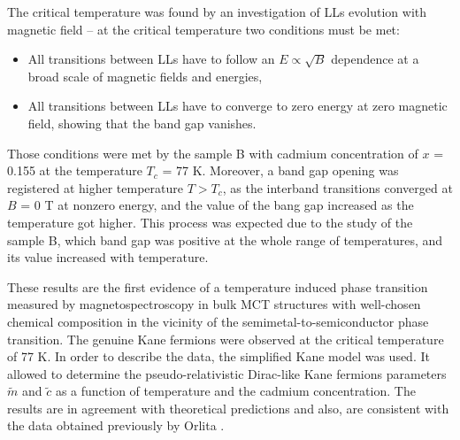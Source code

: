 \documentclass[titlepage,a4paper]{book}
\begin{document}
The critical temperature was found by an investigation of LLs evolution with magnetic field -- at the critical temperature two conditions must be met: 
\begin{itemize}
\item All transitions between LLs have to follow an $E \propto \sqrt{B}$ dependence at a broad scale of magnetic fields and energies,
\item All transitions between LLs have to converge to zero energy at zero magnetic field, showing that the band gap vanishes.
\end{itemize}

Those conditions were met by the sample B with cadmium concentration of $x$ = 0.155 at the temperature $T_c$ = 77 K. Moreover, a band gap opening was registered at higher temperature $T > T_c$, as the interband transitions converged at $B$ = 0 T at nonzero energy, and the value of the bang gap increased as the temperature got higher. This process was expected due to the study of the sample B, which band gap was positive at the whole range of temperatures, and its value increased with temperature.  

These results are the first evidence of a temperature induced phase transition measured by magnetospectroscopy in bulk MCT structures with well-chosen chemical composition in the vicinity of the semimetal-to-semiconductor phase transition. The genuine Kane fermions were observed at the critical temperature of 77 K. In order to describe the data, the simplified Kane model was used. It allowed to determine the pseudo-relativistic Dirac-like Kane fermions parameters $\tilde{m}$ and $\tilde{c}$ as a function of temperature and the cadmium concentration. The results are in agreement with theoretical predictions and also, are consistent with the data obtained previously by Orlita \cite{Orlita_MCT}.
\end{document}
